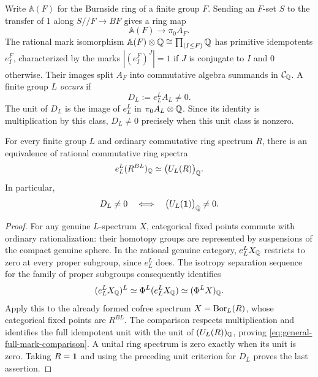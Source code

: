 Write $\mathbb A(F)$ for the Burnside ring of a finite group $F$.  Sending
an $F$-set $S$ to the transfer of $1$ along $S//F\to BF$ gives a ring map
\[
 \mathbb A(F)\longrightarrow\pi_0 A_F.
\]
The rational mark isomorphism
$\mathbb A(F)\otimes\mathbb Q\cong\prod_{(I\le F)}\mathbb Q$
has primitive idempotents $e_I^F$, characterized by the marks
$|(e_I^F)^J|=1$ if $J$ is conjugate to $I$ and $0$ otherwise.
Their images split $A_F$ into commutative algebra summands in
$\mathcal C_{\mathbb Q}$.  A finite group $L$ \emph{occurs} if
\[
 D_L:=e_L^L A_L\ne0.
\]
The unit of $D_L$ is the image of $e_L^L$ in
$\pi_0 A_L\otimes\mathbb Q$.  Since its identity is multiplication by this
class, $D_L\ne0$ precisely when this unit class is nonzero.

\begin{lemma}\label{lem:occurrence-fixed-points}
For every finite group $L$ and ordinary commutative ring spectrum $R$,
there is an equivalence of rational commutative ring spectra
\begin{equation}\label{eq:general-full-mark-comparison}
 e_L^L(R^{BL})_{\mathbb Q}\simeq\bigl(U_L(R)\bigr)_{\mathbb Q}.
\end{equation}
In particular,
\[
 D_L\ne0\quad\Longleftrightarrow\quad
 \bigl(U_L(\mathbf1)\bigr)_{\mathbb Q}\ne0.
\]
\end{lemma}
\begin{proof}
For any genuine $L$-spectrum $X$, categorical fixed points commute with
ordinary rationalization: their homotopy groups are represented by
suspensions of the compact genuine sphere.  In the rational genuine
category, $e_L^L X_{\mathbb Q}$ restricts to zero at every proper subgroup, since
$e_L^L$ does.  The isotropy separation sequence for the family of proper
subgroups consequently identifies
\[
 (e_L^L X_{\mathbb Q})^L\simeq
 \Phi^L(e_L^L X_{\mathbb Q})\simeq(\Phi^L X)_{\mathbb Q}.
\]
Apply this to the already formed cofree spectrum $X=\operatorname{Bor}_L(R)$, whose
categorical fixed points are $R^{BL}$.  The comparison respects
multiplication and identifies the full idempotent unit with the unit
of $(U_L(R))_{\mathbb Q}$, proving
\eqref{eq:general-full-mark-comparison}.  A unital ring spectrum is zero
exactly when its unit is zero.  Taking $R=\mathbf1$ and using the preceding
unit criterion for $D_L$ proves the last assertion.
\end{proof}

